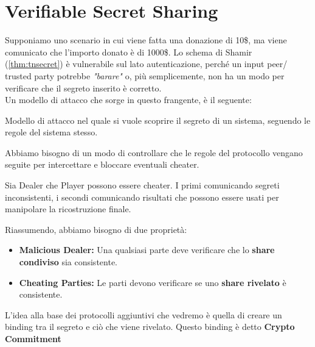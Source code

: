 \section{Verifiable Secret Sharing}
Supponiamo uno scenario in cui viene fatta una donazione di 10\$, ma viene comunicato che l'importo donato è di 1000\$. Lo schema di Shamir (\cref{thm:tnsecret}) è vulnerabile sul lato autenticazione, perché un input peer/ trusted party potrebbe \textit{"barare"} o, più semplicemente, non ha un modo per verificare che il segreto inserito è corretto.\\
Un modello di attacco che sorge in questo frangente, è il seguente:
\begin{definition}\label{def:honestcurious}
Modello di attacco nel quale si vuole scoprire il segreto di un sistema, seguendo le regole del sistema stesso.
\end{definition}
Abbiamo bisogno di un modo di controllare che le regole del protocollo vengano seguite per intercettare e bloccare eventuali cheater.\\
\begin{remark}
Sia Dealer che Player possono essere cheater. I primi comunicando segreti inconsistenti, i secondi comunicando risultati che possono essere usati per manipolare la ricostruzione finale.
\end{remark}
Riassumendo, abbiamo bisogno di due proprietà:
\begin{itemize}
    \item \textbf{Malicious Dealer:} Una qualsiasi parte deve verificare che lo \textbf{share condiviso} sia consistente.
    \item \textbf{Cheating Parties:} Le parti devono verificare se uno \textbf{share rivelato} è consistente.
\end{itemize}
L'idea alla base dei protocolli aggiuntivi che vedremo è quella di creare un binding tra il segreto e ciò che viene rivelato. Questo binding è detto \textbf{Crypto Commitment}
